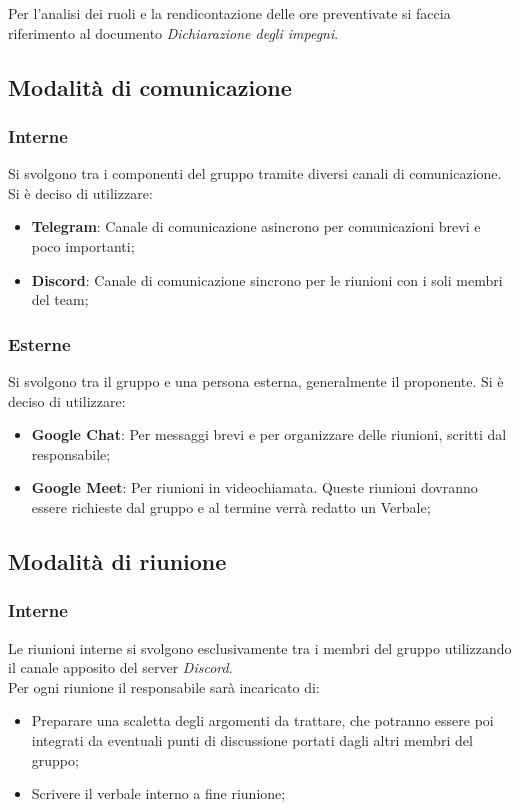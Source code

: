             Per l'analisi dei ruoli e la rendicontazione delle ore preventivate si faccia riferimento al documento \textit{Dichiarazione degli impegni}.

    \subsection{Modalità di comunicazione}
        \subsubsection{Interne}
        Si svolgono tra i componenti del gruppo tramite diversi canali di comunicazione.\\
        Si è deciso di utilizzare:
        \begin{itemize}
            \item \textbf{Telegram}: Canale di comunicazione asincrono per comunicazioni brevi e poco importanti;
            \item \textbf{Discord}: Canale di comunicazione sincrono per le riunioni con i soli membri del team;\\ 
        \end{itemize}
        \subsubsection{Esterne}
        Si svolgono tra il gruppo e una persona esterna, generalmente il proponente.
        Si è deciso di utilizzare:
        \begin{itemize}
            \item \textbf{Google Chat}: Per messaggi brevi e per organizzare delle riunioni, scritti dal responsabile;
            \item \textbf{Google Meet}: Per riunioni in videochiamata. Queste riunioni dovranno essere richieste
            dal gruppo e al termine verrà redatto un Verbale;
        \end{itemize}


    \subsection{Modalità di riunione}
        \subsubsection{Interne}
        Le riunioni interne si svolgono esclusivamente tra i membri del gruppo utilizzando il canale apposito
        del server \textit{Discord}.\\
        Per ogni riunione il responsabile sarà incaricato di:
        \begin{itemize}
            \item Preparare una scaletta degli argomenti da trattare, che potranno essere poi integrati da eventuali
            punti di discussione portati dagli altri membri del gruppo;
            \item Scrivere il verbale interno a fine riunione;
        \end{itemize}


